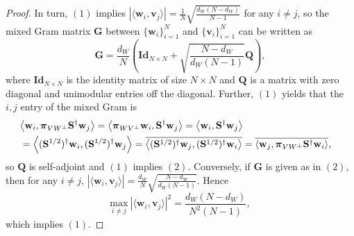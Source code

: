 \documentclass{amsart}
\numberwithin{equation}{section}
\newcommand{\bQ}{{\mathbf Q}}
\newcommand{\bpi}{{\boldsymbol{\pi}}}
\newcommand{\bS}{{\mathbf S}}
\newcommand{\bw}{{\mathbf w}}
\newcommand{\ip}[2]{\left\langle#1,#2\right\rangle}
\theoremstyle{plain}
\theoremstyle{remark}
\theoremstyle{definition}
\begin{document}
\begin{proof}
In turn, $(1)$ implies $|\langle \mathbf{w}_i, \mathbf{v}_j \rangle| =  \frac{1}{N}\sqrt{\frac{d_W(N-d_W)}{N-1}}$ for any $i \neq j$, so the mixed Gram matrix $\mathbf{G}$ between $\{\mathbf{w}_i\}_{i=1}^N$ and $\{\mathbf{v}_i\}_{i=1}^N$ can be written as 
    \begin{equation*}
        \mathbf{G} =\frac{d_W}{N} \left(\mathbf{Id}_{N \times N} + \sqrt{\frac{N-d_W}{d_W(N-1)}}\mathbf{Q}\right),
    \end{equation*}
    where $\mathbf{Id}_{N \times N}$ is the identity matrix of size $N \times N$ and $\mathbf{Q}$ is a matrix with zero diagonal and unimodular entries off the diagonal. Further, $(1)$ yields that the $i,j$ entry of the mixed Gram is 
    \begin{align*}
    \lefteqn{\ip{\bw_i}{\bpi_{VW^\perp}\bS^\dagger \bw_j} = \ip{\bpi_{WV^\perp}\bw_i}{\bS^\dagger \bw_j} = \ip{\bw_i}{\bS^\dagger \bw_j}}\\
    &= \ip{(\bS^{1/2})^\dagger\bw_i}{(\bS^{1/2})^\dagger \bw_j} =\overline{\ip{(\bS^{1/2})^\dagger\bw_j}{(\bS^{1/2})^\dagger \bw_i}} =\overline{\ip{\bw_j}{\bpi_{VW^\perp}\bS^\dagger \bw_i}},
    \end{align*}
    so $\bQ$ is self-adjoint and $(1)$ implies  $(2)$. 
Conversely, if $\mathbf{G}$ is given as in $(2)$, then for any $i \neq j$, $ |\langle \mathbf{w}_i, \mathbf{v}_j \rangle| = \frac{d_W}{N}\sqrt{\frac{N-d_W}{d_W(N-1)}}$. Hence
\begin{equation*}
       \underset{i \neq j}{\text{max}} \ |\langle \mathbf{w}_i, \mathbf{v}_j \rangle |^2 = \frac{d_W(N-d_W)}{N^2(N-1)},
    \end{equation*}
    which implies $(1)$. 


\end{proof}
\end{document}
